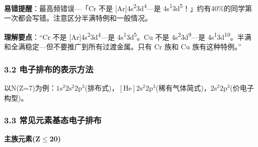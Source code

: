 \documentclass[a4paper,11pt]{ctexart}
\newcommand{\箭}{\ensuremath{\rightarrow}}
\newcommand{\左箭}{\ensuremath{\leftarrow}}
\newcommand{\上箭}{\ensuremath{\uparrow}}
\newcommand{\下箭}{\ensuremath{\downarrow}}
\newcommand{\衡}{\ensuremath{\rightleftharpoons}}
\newcommand{\双箭}{\ensuremath{\leftrightarrow}}
\newcommand{\约等于}{\ensuremath{\approx}}
\newcommand{\小于等于}{\ensuremath{\leq}}
\newcommand{\大于等于}{\ensuremath{\geq}}
\newcommand{\不等于}{\ensuremath{\neq}}
\newcommand{\西格马}{\ensuremath{\sigma}}
\newcommand{\派}{\ensuremath{\pi}}
\begin{document}
\textbf{易错提醒}：最高频错误---「Cr 不是 {[}Ar{]}4s\textsuperscript{2}3d\textsuperscript{4}---是 4s\textsuperscript{1}3d\textsuperscript{5}！」约有40\%的同学第一次都会写错。注意区分半满特例和一般情况。

\textbf{理解要点}：``Cr 不是 {[}Ar{]}4s\textsuperscript{2}3d\textsuperscript{4}---是 4s\textsuperscript{1}3d\textsuperscript{5}。Cu 不是 4s\textsuperscript{2}3d\textsuperscript{9}---是 4s\textsuperscript{1}3d\textsuperscript{10}。半满和全满稳定---但不要推广到所有过渡金属。只有 Cr 族和 Cu 族有这种特例。''

\subsubsection{3.2 电子排布的表示方法}\label{ux7535ux5b50ux6392ux5e03ux7684ux8868ux793aux65b9ux6cd5}

以N(Z=7)为例：\(1\mathrm{s}^2 2\mathrm{s}^2 2\mathrm{p}^3\)(排布式)，\([\mathrm{He}] 2\mathrm{s}^2 2\mathrm{p}^3\)(稀有气体简式)，\(2\mathrm{s}^2 2\mathrm{p}^3\)(价电子构型)。

\subsubsection{3.3 常见元素基态电子排布}\label{ux5e38ux89c1ux5143ux7d20ux57faux6001ux7535ux5b50ux6392ux5e03}

\textbf{主族元素(Z\小于等于20)}
\end{document}
